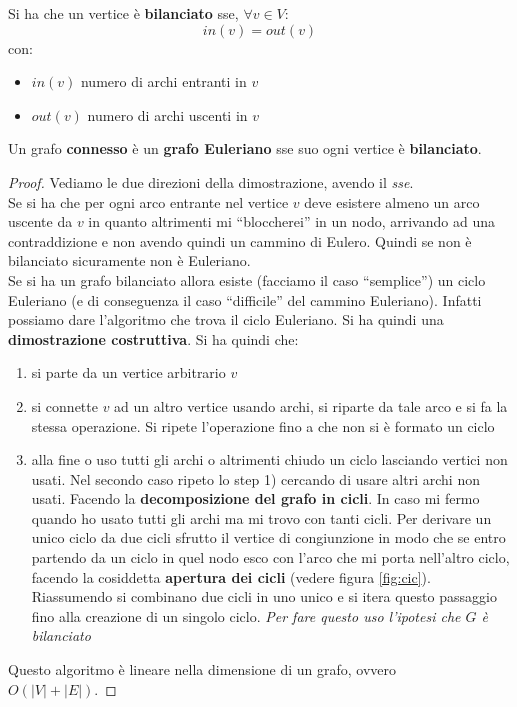 \documentclass[a4paper,12pt, oneside]{book}
\begin{document}
\begin{definizione}
  Si ha che un vertice è \textbf{bilanciato} sse, $\forall v\in V$:
  \[in(v)=out(v)\]
  con:
  \begin{itemize}
    \item $in(v)$ numero di archi entranti in $v$
    \item $out(v)$ numero di archi uscenti in $v$
  \end{itemize}
\end{definizione}
\begin{teorema}
  Un grafo \textbf{connesso} è un \textbf{grafo Euleriano} sse suo ogni vertice
  è \textbf{bilanciato}. 
\end{teorema}
\begin{proof}
  Vediamo le due direzioni della dimostrazione, avendo il \textit{sse}.\\
  Se si ha che per ogni arco entrante nel vertice $v$ deve esistere almeno un
  arco uscente da $v$ in quanto altrimenti mi ``bloccherei'' in un nodo,
  arrivando ad una contraddizione e non avendo quindi un cammino di
  Eulero. Quindi se non è bilanciato sicuramente non è Euleriano.\\
  Se si ha un grafo bilanciato allora esiste (facciamo il caso ``semplice'') un
  ciclo Euleriano (e di conseguenza il caso ``difficile'' del cammino
  Euleriano). Infatti possiamo dare l'algoritmo che trova il ciclo Euleriano. Si
  ha quindi una \textbf{dimostrazione costruttiva}. Si ha quindi che:
  \begin{enumerate}
    \item si parte da un vertice arbitrario $v$
    \item si connette $v$ ad un altro vertice usando archi, si riparte da tale
    arco e si fa la stessa operazione. Si ripete l'operazione fino a che non si
    è formato un ciclo 
    \item alla fine o uso tutti gli archi o altrimenti chiudo un ciclo lasciando
    vertici non usati. Nel secondo caso ripeto lo step 1) cercando di usare
    altri archi non usati. Facendo la \textbf{decomposizione del grafo in
      cicli}. In caso mi fermo quando ho usato tutti gli archi ma mi trovo con
    tanti cicli. Per derivare un unico ciclo da due cicli sfrutto il vertice di
    congiunzione in modo che se entro partendo da un ciclo in quel nodo esco con
    l'arco che mi porta nell'altro ciclo, facendo la cosiddetta \textbf{apertura
      dei cicli} (vedere figura \ref{fig:cic}). \\
    Riassumendo si combinano due cicli in uno unico e si itera questo passaggio
    fino alla creazione di un singolo ciclo. \textit{Per fare questo uso
      l'ipotesi che $G$ è bilanciato}
  \end{enumerate}
  Questo algoritmo è lineare nella dimensione di un grafo, ovvero\\
  $O(|V|+|E|)$.  
\end{proof}
\end{document}

